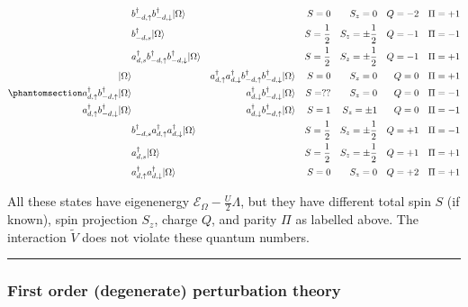 \documentclass[
  letterpaper,
  DIV=11,
  numbers=noendperiod]{scrartcl}
\begin{document}
\begin{equation}\protect\phantomsection\label{eq-states16}{
\begin{align}
 & b^\dagger_{-d,\uparrow}b^\dagger_{-d,\downarrow}|\Omega\rangle & & & S=0 &&  S_z=0 && Q=-2 && \Pi=+1\\
& b^\dagger_{-d,s}|\Omega\rangle &  & & S=\frac{1}{2} && S_z=\pm\frac{1}{2} && Q=-1 && \Pi=-1\\
& a^\dagger_{d,s}b^\dagger_{-d,\uparrow}b^\dagger_{-d,\downarrow}|\Omega\rangle &  & & S=\frac{1}{2} && S_z=\pm\frac{1}{2} && Q=-1 && \Pi=+1\\
|\Omega\rangle & & a^\dagger_{d,\uparrow}a^\dagger_{d,\downarrow}b^\dagger_{-d,\uparrow}b^\dagger_{-d,\downarrow}|\Omega\rangle & & S=0 && S_z=0 && Q=0 && \Pi=+1\\
a^\dagger_{d,\uparrow}b^\dagger_{-d,\uparrow}|\Omega\rangle & & a^\dagger_{d,\downarrow}b^\dagger_{-d,\downarrow}|\Omega\rangle  & & S=?? && S_z=0 && Q=0 && \Pi=-1\\
a^\dagger_{d,\uparrow}b^\dagger_{-d,\downarrow}|\Omega\rangle & & a^\dagger_{d,\downarrow}b^\dagger_{-d,\uparrow}|\Omega\rangle  & & S=1 && S_z=\pm1 && Q=0 && \Pi=-1\\
& b^\dagger_{-d,s}a^\dagger_{d,\uparrow}a^\dagger_{d,\downarrow}|\Omega\rangle &  & & S=\frac{1}{2} && S_z=\pm\frac{1}{2} && Q=+1 && \Pi=-1\\
& a^\dagger_{d,s}|\Omega\rangle &  & & S=\frac{1}{2} && S_z=\pm\frac{1}{2} && Q=+1 && \Pi=+1\\
& a^\dagger_{d,\uparrow}a^\dagger_{d,\downarrow}|\Omega\rangle & & & S=0 &&  S_z=0 && Q=+2 && \Pi=+1\\
\end{align}
}\end{equation}

All these states have eigenenergy
\(\mathcal{E}_\Omega-\frac{U}{2}\Lambda\), but they have different total
spin \(S\) (if known), spin projection \(S_z\), charge \(Q\), and parity
\(\Pi\) as labelled above. The interaction \(\tilde V\) does not violate
these quantum numbers.

\begin{center}\rule{0.5\linewidth}{0.5pt}\end{center}

\subsubsection{First order (degenerate) perturbation
theory}\label{first-order-degenerate-perturbation-theory}
\end{document}
